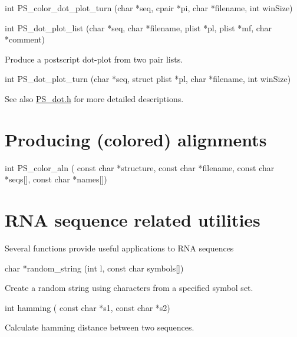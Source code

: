 \begin{DoxyVerb}
int PS_color_dot_plot_turn (char *seq,
                            cpair *pi,
                            char *filename,
                            int winSize)
\end{DoxyVerb}
 

\begin{DoxyVerb}
int PS_dot_plot_list (char *seq,
                      char *filename,
                      plist *pl,
                      plist *mf,
                      char *comment)
\end{DoxyVerb}
 Produce a postscript dot-\/plot from two pair lists. 

\begin{DoxyVerb}
int PS_dot_plot_turn (char *seq,
                      struct plist *pl,
                      char *filename,
                      int winSize)
\end{DoxyVerb}
 

\begin{DoxySeeAlso}{See also}
\hyperlink{PS__dot_8h}{PS\_\-dot.h} for more detailed descriptions.
\end{DoxySeeAlso}
\hypertarget{mp__utils_utils_aln}{}\section{Producing (colored) alignments}\label{mp__utils_utils_aln}
\begin{DoxyVerb}
int PS_color_aln (
            const char *structure,
            const char *filename,
            const char *seqs[],
            const char *names[])
\end{DoxyVerb}
 

\hypertarget{mp__utils_utils_seq}{}\section{RNA sequence related utilities}\label{mp__utils_utils_seq}
Several functions provide useful applications to RNA sequences

\begin{DoxyVerb}
char  *random_string (int l,
                      const char symbols[])
\end{DoxyVerb}
 Create a random string using characters from a specified symbol set. 

\begin{DoxyVerb}
int   hamming ( const char *s1,
                const char *s2)
\end{DoxyVerb}
 Calculate hamming distance between two sequences. 

